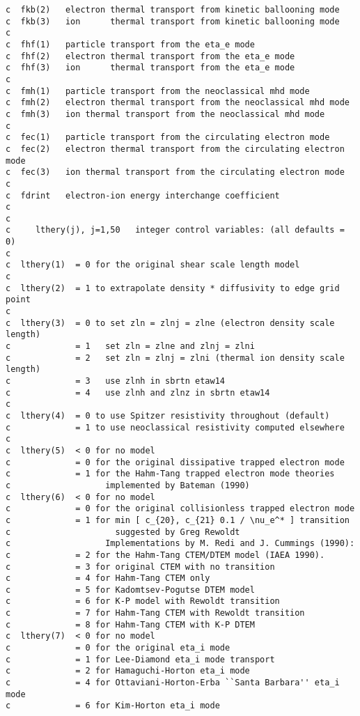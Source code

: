 \begin{verbatim}
c  fkb(2)   electron thermal transport from kinetic ballooning mode
c  fkb(3)   ion      thermal transport from kinetic ballooning mode
c
c  fhf(1)   particle transport from the eta_e mode
c  fhf(2)   electron thermal transport from the eta_e mode
c  fhf(3)   ion      thermal transport from the eta_e mode
c
c  fmh(1)   particle transport from the neoclassical mhd mode
c  fmh(2)   electron thermal transport from the neoclassical mhd mode
c  fmh(3)   ion thermal transport from the neoclassical mhd mode
c
c  fec(1)   particle transport from the circulating electron mode
c  fec(2)   electron thermal transport from the circulating electron mode
c  fec(3)   ion thermal transport from the circulating electron mode
c
c  fdrint   electron-ion energy interchange coefficient
c
c
c     lthery(j), j=1,50   integer control variables: (all defaults = 0)
c
c  lthery(1)  = 0 for the original shear scale length model
c
c  lthery(2)  = 1 to extrapolate density * diffusivity to edge grid point
c
c  lthery(3)  = 0 to set zln = zlnj = zlne (electron density scale length)
c             = 1   set zln = zlne and zlnj = zlni
c             = 2   set zln = zlnj = zlni (thermal ion density scale length)
c             = 3   use zlnh in sbrtn etaw14
c             = 4   use zlnh and zlnz in sbrtn etaw14
c
c  lthery(4)  = 0 to use Spitzer resistivity throughout (default)
c             = 1 to use neoclassical resistivity computed elsewhere
c
c  lthery(5)  < 0 for no model
c             = 0 for the original dissipative trapped electron mode
c             = 1 for the Hahm-Tang trapped electron mode theories
c                   implemented by Bateman (1990)
c  lthery(6)  < 0 for no model
c             = 0 for the original collisionless trapped electron mode
c             = 1 for min [ c_{20}, c_{21} 0.1 / \nu_e^* ] transition
c                     suggested by Greg Rewoldt
c                   Implementations by M. Redi and J. Cummings (1990):
c             = 2 for the Hahm-Tang CTEM/DTEM model (IAEA 1990).
c             = 3 for original CTEM with no transition
c             = 4 for Hahm-Tang CTEM only
c             = 5 for Kadomtsev-Pogutse DTEM model
c             = 6 for K-P model with Rewoldt transition
c             = 7 for Hahm-Tang CTEM with Rewoldt transition
c             = 8 for Hahm-Tang CTEM with K-P DTEM
c  lthery(7)  < 0 for no model
c             = 0 for the original eta_i mode
c             = 1 for Lee-Diamond eta_i mode transport
c             = 2 for Hamaguchi-Horton eta_i mode
c             = 4 for Ottaviani-Horton-Erba ``Santa Barbara'' eta_i mode
c             = 6 for Kim-Horton eta_i mode

\end{verbatim}
